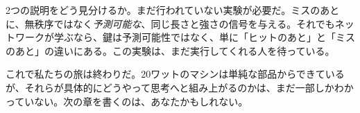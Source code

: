 2つの説明をどう見分けるか。まだ行われていない実験が必要だ。ミスのあとに、無秩序ではなく\emph{予測可能な}、同じ長さと強さの信号を与える。それでもネットワークが学ぶなら、鍵は予測可能性ではなく、単に「ヒットのあと」と「ミスのあと」の違いにある。この実験は、まだ実行してくれる人を待っている。

これで私たちの旅は終わりだ。20ワットのマシンは単純な部品からできているが、それらが具体的にどうやって思考へと組み上がるのかは、まだ一部しかわかっていない。次の章を書くのは、あなたかもしれない。


